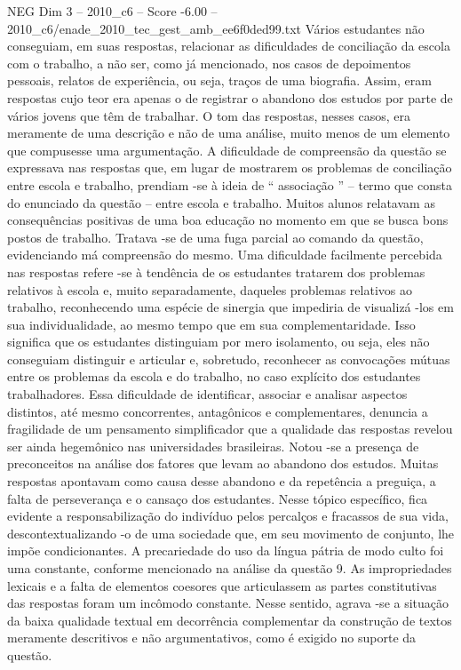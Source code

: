 \begin{textsample}{NEG Dim 3 – 2010\_c6 – Score -6.00 – 2010\_c6/enade\_2010\_tec\_gest\_amb\_ee6f0ded99.txt}
Vários estudantes não conseguiam, em suas respostas, relacionar as dificuldades de conciliação da escola com o trabalho, a não ser, como já mencionado, nos casos de depoimentos pessoais, relatos de experiência, ou seja, traços de uma biografia.
Assim, eram respostas cujo teor era apenas o de registrar o abandono dos estudos por parte de vários jovens que têm de trabalhar.
O tom das respostas, nesses casos, era meramente de uma descrição e não de uma análise, muito menos de um elemento que compusesse uma argumentação.
A dificuldade de compreensão da questão se expressava nas respostas que, em lugar de mostrarem os problemas de conciliação entre escola e trabalho, prendiam -se à ideia de “ associação ” – termo que consta do enunciado da questão – entre escola e trabalho.
Muitos alunos relatavam as consequências positivas de uma boa educação no momento em que se busca bons postos de trabalho.
Tratava -se de uma fuga parcial ao comando da questão, evidenciando má compreensão do mesmo.
Uma dificuldade facilmente percebida nas respostas refere -se à tendência de os estudantes tratarem dos problemas relativos à escola e, muito separadamente, daqueles problemas relativos ao trabalho, reconhecendo uma espécie de sinergia que impediria de visualizá -los em sua individualidade, ao mesmo tempo que em sua complementaridade.
Isso significa que os estudantes distinguiam por mero isolamento, ou seja, eles não conseguiam distinguir e articular e, sobretudo, reconhecer as convocações mútuas entre os problemas da escola e do trabalho, no caso explícito dos estudantes trabalhadores.
Essa dificuldade de identificar, associar e analisar aspectos distintos, até mesmo concorrentes, antagônicos e complementares, denuncia a fragilidade de um pensamento simplificador que a qualidade das respostas revelou ser ainda hegemônico nas universidades brasileiras.
Notou -se a presença de preconceitos na análise dos fatores que levam ao abandono dos estudos.
Muitas respostas apontavam como causa desse abandono e da repetência a preguiça, a falta de perseverança e o cansaço dos estudantes.
Nesse tópico específico, fica evidente a responsabilização do indivíduo pelos percalços e fracassos de sua vida, descontextualizando -o de uma sociedade que, em seu movimento de conjunto, lhe impõe condicionantes.
A precariedade do uso da língua pátria de modo culto foi uma constante, conforme mencionado na análise da questão 9.
As impropriedades lexicais e a falta de elementos coesores que articulassem as partes constitutivas das respostas foram um incômodo constante.
Nesse sentido, agrava -se a situação da baixa qualidade textual em decorrência complementar da construção de textos meramente descritivos e não argumentativos, como é exigido no suporte da questão.

\end{textsample}
